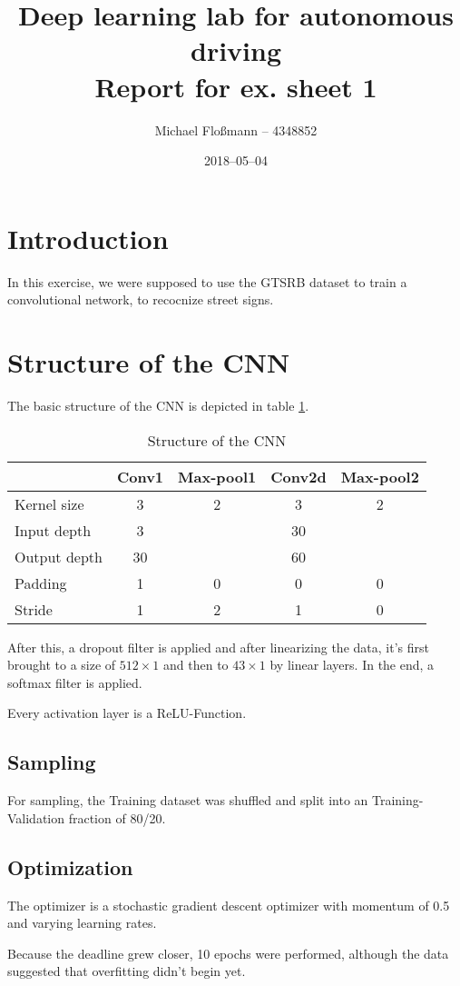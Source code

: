 \documentclass[12pt, a4paper]{scrartcl}
\title{Deep learning lab for autonomous driving \\ Report for ex. sheet 1}
\author{Michael Floßmann -- 4348852}
\date{2018--05--04}
\begin{document}
\maketitle
\section{Introduction}
In this exercise, we were supposed to use the GTSRB dataset to train a
convolutional network, to recocnize street signs.

\section{Structure of the CNN}
The basic structure of the CNN is depicted in table \ref{tab:net}.
\begin{table}[!htbp]
  \centering
  \begin{tabular}{lcccc}
    &Conv1&Max-pool1&Conv2d&Max-pool2\\ \hline
    Kernel size & 3 & 2 & 3 & 2 \\
    Input depth & 3 & & 30 & \\
    Output depth & 30 & & 60 & \\
    Padding & 1 & 0 & 0 & 0 \\
    Stride & 1 & 2 & 1 & 0 \\
  \end{tabular}
  \label{tab:net}
  \caption{Structure of the CNN}
\end{table}

After this, a dropout filter is applied and after linearizing the data, it's
first brought to a size of $512\times 1$ and then to $43\times 1$ by linear
layers. In the end, a softmax filter is applied.

Every activation layer is a ReLU-Function.

\subsection{Sampling}
For sampling, the Training dataset was shuffled and split into an
Training-Validation fraction of 80/20.

\subsection{Optimization}
The optimizer is a stochastic gradient descent optimizer with momentum of 0.5
and varying learning rates.

Because the deadline grew closer, 10 epochs were performed, although the data
suggested that overfitting didn't begin yet.
\end{document}
